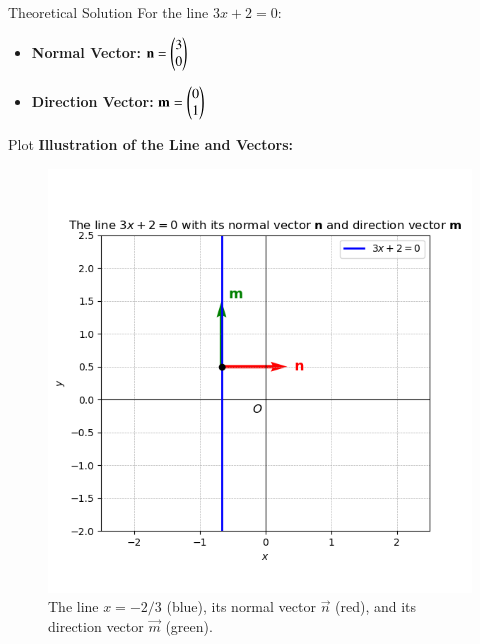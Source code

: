 \documentclass{beamer}
\begin{document}
\begin{frame}{Theoretical Solution}
For the line $3x+2=0$:
\bigskip
\begin{itemize}
    \item \textbf{Normal Vector:} $\mathbf{n} = \begin{pmatrix} 3 \\ 0 \end{pmatrix}$
    \bigskip
    \item \textbf{Direction Vector:} $\mathbf{m} = \begin{pmatrix} 0 \\ 1 \end{pmatrix}$
\end{itemize}
\end{frame}

\begin{frame}{Plot}
\centering
\textbf{Illustration of the Line and Vectors:}
\begin{figure}[h!]
    \centering
    \includegraphics[width=0.7\columnwidth]{figs/fig1.png}
    \caption{The line $x = -2/3$ (blue), its normal vector $\vec{n}$ (red), and its direction vector $\vec{m}$ (green).}
\end{figure}
\end{frame}
\end{document}

